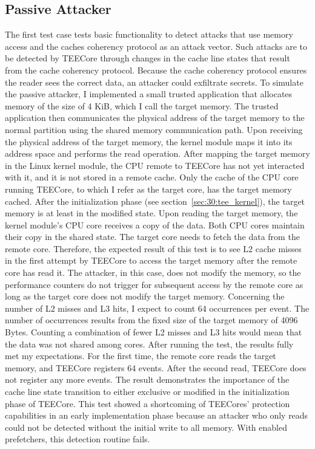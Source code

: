 \subsection{Passive Attacker}
\label{sec:evaluation:passive}
The first test case tests basic functionality to detect attacks that use memory
access and the caches coherency protocol as an attack vector. Such attacks are
to be detected by TEECore through changes in the cache line states that result
from the cache coherency protocol. Because the cache coherency protocol ensures
the reader sees the correct data, an attacker could exfiltrate secrets. To
simulate the passive attacker, I implemented a small trusted application that
allocates memory of the size of 4 KiB, which I call the target memory. The
trusted application then communicates the physical address of the target memory
to the normal partition using the shared memory communication path. Upon
receiving the physical address of the target memory, the kernel module maps it
into its address space and performs the read operation. After mapping the
target memory in the Linux kernel module, the CPU remote to TEECore has not yet
interacted with it, and it is not stored in a remote cache. Only the cache of
the CPU core running TEECore, to which I refer as the target core, has the
target memory cached. After the initialization phase (see
section~\ref{sec:30:tee_kernel}), the target memory is at least in the modified
state. Upon reading the target memory, the kernel module's CPU
core receives a copy of the data. Both CPU cores maintain their copy in the
shared state. The target core needs to fetch the data from the remote core.
Therefore, the expected result of this test is to see L2 cache misses in the
first attempt by TEECore to access the target memory after the remote core has
read it. The attacker, in this case, does not modify the memory, so the
performance counters do not trigger for subsequent access by the remote core as
long as the target core does not modify the target memory. Concerning the number
of L2 misses and L3 hits, I expect to count 64 occurrences per event. The number
of occurrences results from the fixed size of the target memory of 4096 Bytes.
Counting a combination of fewer L2 misses and L3 hits would mean that the data
was not shared among cores. After running the test, the results fully met my
expectations. For the first time, the remote core reads the target memory, and
TEECore registers 64 events. After the second read, TEECore does not register
any more events. The result demonstrates the importance of the cache line state
transition to either exclusive or modified in the initialization phase of
TEECore. This test showed a shortcoming of TEECores' protection capabilities in
an early implementation phase because an attacker who only reads could not be
detected without the initial write to all memory. With enabled prefetchers, this
detection routine fails.\\

